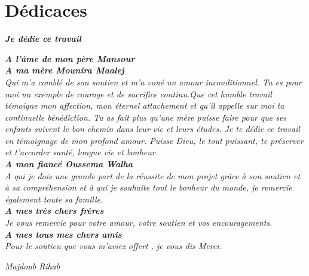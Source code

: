 \section*{Dédicaces}
\vspace{1.0in}

\begin{center}
\textit{\textsl{ \textbf{Je dédie ce travail} } }
\end{center}
\begin{center}
\textsl{
 \textbf{A l'âme de mon père Mansour}
 \\[0.2in]
 \textbf{A ma mère Mounira Maalej}\\ 
 Qui m'a comblé de son soutien et m'a 
voué un amour inconditionnel. Tu es pour moi un exemple de
courage et de sacrifice continu.Que cet humble travail témoigne
mon affection, mon éternel attachement et qu'il appelle sur moi
ta continuelle bénédiction. Tu as fait plus qu’une mère puisse faire pour que ses 
enfants suivent le bon chemin dans leur vie et leurs études. 
Je te dédie ce travail en témoignage de mon profond 
amour. Puisse Dieu, le tout puissant, te préserver et 
t’accorder santé, longue vie et bonheur.
\\[0.2in]
\textbf{A mon fiancé Oussema Walha}\\
A qui je dois une grande part de la réussite de mon projet grâce à
son soutien et à sa compréhension et à qui je souhaite tout le bonheur du monde,
je remercie également toute sa famille.
\\[0.2in]
\textbf{A mes très chers frères}\\
Je vous remercie pour votre amour, 
votre soutien et vos encouragements. 
\\[0.2in]
\textbf{A mes tous mes chers amis}\\
Pour le soutien que vous m'aviez
offert , je vous dis Merci.}

\begin{flushright}
 \textit{\emph {Majdoub Rihab}}
\end{flushright}
\end{center}
